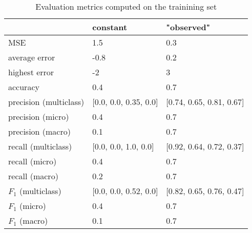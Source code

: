 \begin{table}[h]
\caption{Evaluation metrics computed on the trainining set}
\label{tbl:sais_eval_trainining}
\begin{tabular}{lll}
\toprule
 & constant & "observed" \\
\midrule
MSE & 1.5 & 0.3 \\
average error & -0.8 & 0.2 \\
highest error & -2 & 3 \\
accuracy & 0.4 & 0.7 \\
precision (multiclass) & [0.0, 0.0, 0.35, 0.0] & [0.74, 0.65, 0.81, 0.67] \\
precision (micro) & 0.4 & 0.7 \\
precision (macro) & 0.1 & 0.7 \\
recall (multiclass) & [0.0, 0.0, 1.0, 0.0] & [0.92, 0.64, 0.72, 0.37] \\
recall (micro) & 0.4 & 0.7 \\
recall (macro) & 0.2 & 0.7 \\
$F_1$ (multiclass) & [0.0, 0.0, 0.52, 0.0] & [0.82, 0.65, 0.76, 0.47] \\
$F_1$ (micro) & 0.4 & 0.7 \\
$F_1$ (macro) & 0.1 & 0.7 \\
\bottomrule
\end{tabular}
\end{table}
